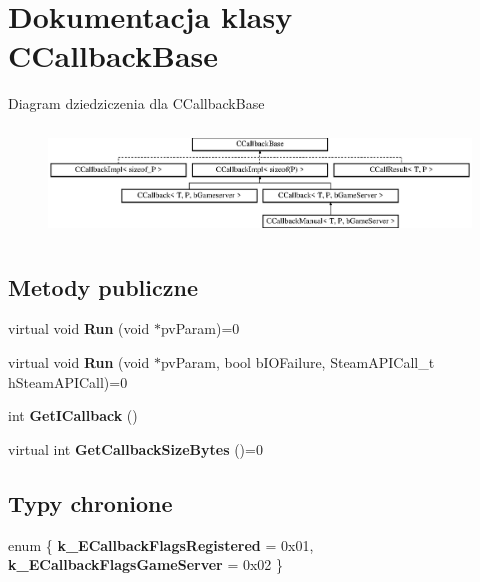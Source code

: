 \hypertarget{class_c_callback_base}{}\section{Dokumentacja klasy C\+Callback\+Base}
\label{class_c_callback_base}
Diagram dziedziczenia dla C\+Callback\+Base\begin{figure}[H]
\begin{center}
\leavevmode
\includegraphics[height=2.928105cm]{class_c_callback_base}
\end{center}
\end{figure}
\subsection*{Metody publiczne}
\begin{DoxyCompactItemize}
\item 
\mbox{\label{class_c_callback_base_a8ec1dcecacbf12f0cade541d7c736cec}} 
virtual void {\bfseries Run} (void $\ast$pv\+Param)=0
\item 
\mbox{\label{class_c_callback_base_a958087c4f7ba0004bdf7b668e9ef7f51}} 
virtual void {\bfseries Run} (void $\ast$pv\+Param, bool b\+I\+O\+Failure, Steam\+A\+P\+I\+Call\+\_\+t h\+Steam\+A\+P\+I\+Call)=0
\item 
\mbox{\label{class_c_callback_base_af6c3c5a7214deea9da66983f94b7b31b}} 
int {\bfseries Get\+I\+Callback} ()
\item 
\mbox{\label{class_c_callback_base_afcf6da82f51fb962330f3b5d61c618d8}} 
virtual int {\bfseries Get\+Callback\+Size\+Bytes} ()=0
\end{DoxyCompactItemize}
\subsection*{Typy chronione}
\begin{DoxyCompactItemize}
\item 
\mbox{\label{class_c_callback_base_a4316a6129595bce2bc598ca6fdefed6d}} 
enum \{ {\bfseries k\+\_\+\+E\+Callback\+Flags\+Registered} = 0x01, 
{\bfseries k\+\_\+\+E\+Callback\+Flags\+Game\+Server} = 0x02
 \}
\end{DoxyCompactItemize}
